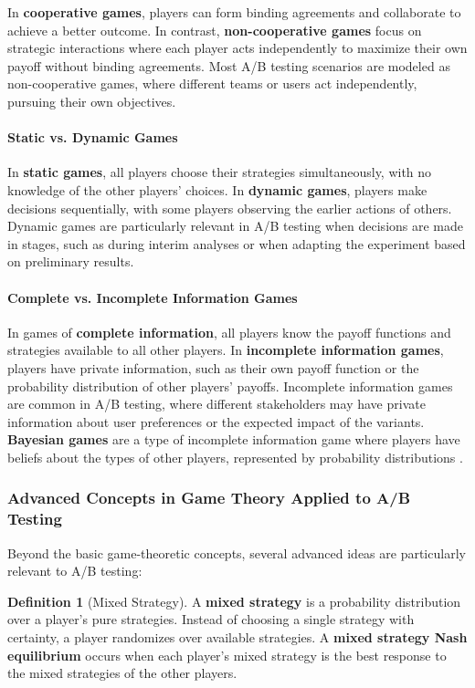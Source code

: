\documentclass[magisterska, english]{pwr_wmat_praca_dyplomowa}
\theoremstyle{plain}
\numberwithin{theorem}{chapter}
\theoremstyle{definition}
\numberwithin{theorem}{chapter}
\newtheorem{definition}[theorem]{Definition}
\begin{document}
In \textbf{cooperative games}, players can form binding agreements and collaborate to achieve a better outcome. In contrast, \textbf{non-cooperative games} focus on strategic interactions where each player acts independently to maximize their own payoff without binding agreements. Most A/B testing scenarios are modeled as non-cooperative games, where different teams or users act independently, pursuing their own objectives.

\paragraph{Static vs. Dynamic Games}

In \textbf{static games}, all players choose their strategies simultaneously, with no knowledge of the other players' choices. In \textbf{dynamic games}, players make decisions sequentially, with some players observing the earlier actions of others. Dynamic games are particularly relevant in A/B testing when decisions are made in stages, such as during interim analyses or when adapting the experiment based on preliminary results.

\paragraph{Complete vs. Incomplete Information Games}

In games of \textbf{complete information}, all players know the payoff functions and strategies available to all other players. In \textbf{incomplete information games}, players have private information, such as their own payoff function or the probability distribution of other players' payoffs. Incomplete information games are common in A/B testing, where different stakeholders may have private information about user preferences or the expected impact of the variants. \textbf{Bayesian games} are a type of incomplete information game where players have beliefs about the types of other players, represented by probability distributions \cite{Harsanyi1967}.

\subsubsection{Advanced Concepts in Game Theory Applied to A/B Testing}

Beyond the basic game-theoretic concepts, several advanced ideas are particularly relevant to A/B testing:

\begin{definition}[Mixed Strategy]
	A \textbf{mixed strategy} is a probability distribution over a player's pure strategies. Instead of choosing a single strategy with certainty, a player randomizes over available strategies. A \textbf{mixed strategy Nash equilibrium} occurs when each player's mixed strategy is the best response to the mixed strategies of the other players.
\end{definition}
\end{document}
